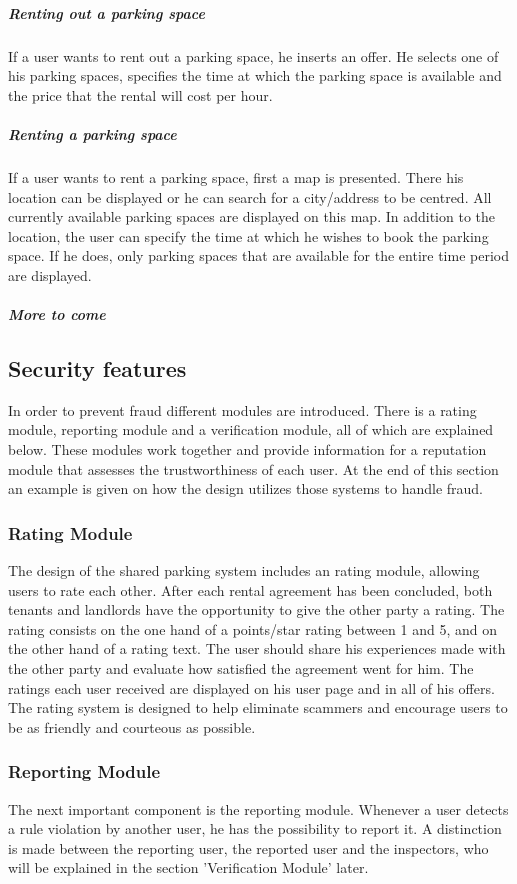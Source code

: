 \documentclass[
a4paper,     %
titlepage,   %
14pt         %
]{scrartcl}  %
\theoremstyle{mystyle}
\begin{document}
\subparagraph{Renting out a parking space} If a user wants to rent out a parking space, he inserts an offer. He selects one of his parking spaces, specifies the time at which the parking space is available and the price that the rental will cost per hour.

\subparagraph{Renting a parking space} If a user wants to rent a parking space, first a map is presented. There his location can be displayed or he can search for a city/address to be centred. All currently available parking spaces are displayed on this map. In addition to the location, the user can specify the time at which he wishes to book the parking space. If he does, only parking spaces that are available for the entire time period are displayed.

\subparagraph{More to come}
  
\subsection{Security features}
In order to prevent fraud different modules are introduced. There is a rating module, reporting module and a verification module, all of which are explained below. These modules work together and provide information for a reputation module that assesses the trustworthiness of each user. At the end of this section an example is given on how the design utilizes those systems to handle fraud.

\subsubsection{Rating Module} The design of the shared parking system includes an rating module, allowing users to rate each other. After each rental agreement has been concluded, both tenants and landlords have the opportunity to give the other party a rating. The rating consists on the one hand of a points/star rating between 1 and 5, and on the other hand of a rating text. The user should share his experiences made with the other party and evaluate how satisfied the agreement went for him. The ratings each user received are displayed on his user page and in all of his offers. The rating system is designed to help eliminate scammers and encourage users to be as friendly and courteous as possible.

\subsubsection{Reporting Module} The next important component is the reporting module. Whenever a user detects a rule violation by another user, he has the possibility to report it. A distinction is made between the reporting user, the reported user and the inspectors, who will be explained in the section 'Verification Module' later.
\end{document}
